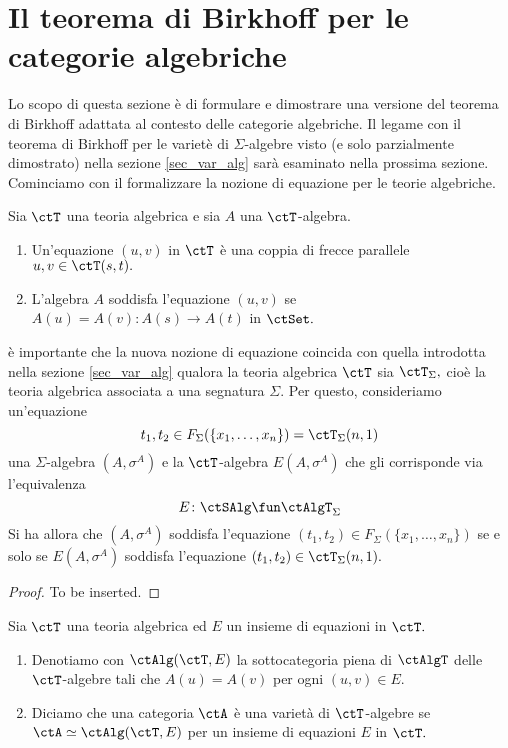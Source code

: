 \section{Il teorema di Birkhoff per le categorie algebriche}\label{sec_th_Birkhoff}

Lo scopo di questa sezione è di formulare e dimostrare una versione del teorema di Birkhoff adattata al contesto delle 
categorie algebriche. Il legame con il teorema di Birkhoff per le varietè di $\Sigma$-algebre visto (e solo parzialmente dimostrato)
nella sezione \ref{sec_var_alg} sarà esaminato nella prossima sezione. Cominciamo con il formalizzare la nozione di equazione 
per le teorie algebriche.

\begin{definition}\label{def_equaz_th_alg}
Sia $\ctT$ una teoria algebrica e sia $A$ una $\ctT$-algebra.
\begin{enumerate}
\item Un'equazione $(u,v)$ in $\ctT$ è una coppia di frecce parallele $u,v \in \ctT(s,t).$
\item L'algebra $A$ soddisfa l'equazione $(u,v)$ se $A(u)=A(v) \colon A(s) \to A(t)$ in $\ctSet.$
\end{enumerate}
\end{definition} 

\begin{remark}\label{oss_conf_equaz}
è importante che la nuova nozione di equazione coincida con quella introdotta nella sezione \ref{sec_var_alg} qualora la teoria algebrica
$\ctT$ sia $\ctT_{\Sigma},$ cioè la teoria algebrica associata a una segnatura $\Sigma.$ Per questo, consideriamo un'equazione
$$t_1,t_2 \in F_{\Sigma}(\{x_1,\ldots,x_n\}) = \ctT_{\Sigma}(n,1)$$
una $\Sigma$-algebra $(A, \sigma^A)$ e la $\ctT$-algebra $E(A,\sigma^A)$ che gli corrisponde via l'equivalenza 
$$E \colon \ctSAlg \fun \ctAlgT_{\Sigma}$$
Si ha allora che $(A,\sigma^A)$ soddisfa l'equazione $(t_1,t_2) \in F_{\Sigma}(\{x_1,\ldots,x_n\})$ se e solo se $E(A,\sigma^A)$ soddisfa
l'equazione $(t_1,t_2) \in \ctT_{\Sigma}(n,1).$
\end{remark}

\begin{proof}
To be inserted.
\end{proof}

\begin{definition}\label{def_var_AlgT}
Sia $\ctT$ una teoria algebrica ed $E$ un insieme di equazioni in $\ctT.$
\begin{enumerate}
\item Denotiamo con $\ctAlg(\ctT,E)$ la sottocategoria piena di $\ctAlgT$ delle $\ctT$-algebre tali che $A(u)=A(v)$ per ogni $(u,v) \in E.$
\item Diciamo che una categoria $\ctA$ è una varietà di $\ctT$-algebre se $\ctA \simeq \ctAlg(\ctT,E)$ per un insieme di equazioni $E$ in $\ctT.$
\end{enumerate}
\end{definition} 

